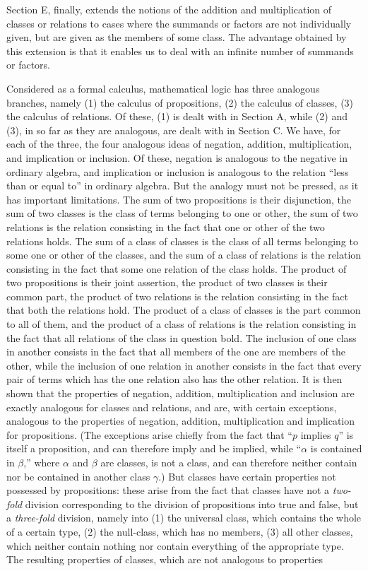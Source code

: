 \documentclass[letterpaper,12pt,openany,leqno]{book}
\newcommand{\pagefirst}[1]{\marginnote[\boxed{\text{#1}}]{\boxed{\text{#1}}}}
\begin{document}
Section E, finally, extends the notions of the addition and multiplication of classes or relations to cases where the summands or factors are not individually given, but are given as the members of some class. The advantage obtained by this extension is that it enables us to deal with an infinite number of summands or factors.

Considered as a formal calculus, mathematical logic has three analogous branches, namely (1) the calculus of propositions, (2) the calculus of classes, (3) the calculus of relations. Of these, (1) is dealt with in Section A, while (2) and (3), in so far as they are analogous, are dealt with in Section C. We have, for each of the three, the four analogous ideas of negation, addition, multiplication, and implication or inclusion. Of these, negation is analogous to the negative in ordinary algebra, and implication or inclusion is analogous to the relation ``less than or equal to'' in ordinary algebra. But the analogy must not be pressed, as it has important limitations. The sum of two propositions is their disjunction, the sum of two classes is the class of terms belonging to one or other, the sum of two relations is the relation consisting in the fact that one or other of the two relations holds. The sum of a class \pagefirst{93} of classes is the class of all terms belonging to some one or other of the classes, and the sum of a class of relations is the relation consisting in the fact that some one relation of the class holds. The product of two propositions is their joint assertion, the product of two classes is their common part, the product of two relations is the relation consisting in the fact that both the relations hold. The product of a class of classes is the part common to all of them, and the product of a class of relations is the relation consisting in the fact that all relations of the class in question bold. The inclusion of one class in another consists in the fact that all members of the one are members of the other, while the inclusion of one relation in another consists in the fact that every pair of terms which has the one relation also has the other relation. It is then shown that the properties of negation, addition, multiplication and inclusion are exactly analogous for classes and relations, and are, with certain exceptions, analogous to the properties of negation, addition, multiplication and implication for propositions. (The exceptions arise chiefly from the fact that ``$p$ implies $q$'' is itself a proposition, and can therefore imply and be implied, while ``$\alpha$ is contained in $\beta$,'' where $\alpha$ and $\beta$ are classes, is not a class, and can therefore neither contain nor be contained in another class $\gamma$.) But classes have certain properties not possessed by propositions: these arise from the fact that classes have not a \textit{two-fold} division corresponding to the division of propositions into true and false, but a \textit{three-fold} division, namely into (1) the universal class, which contains the whole of a certain type, (2) the null-class, which has no members, (3) all other classes, which neither contain nothing nor contain everything of the appropriate type. The resulting properties of classes, which are not analogous to properties 
\end{document}
